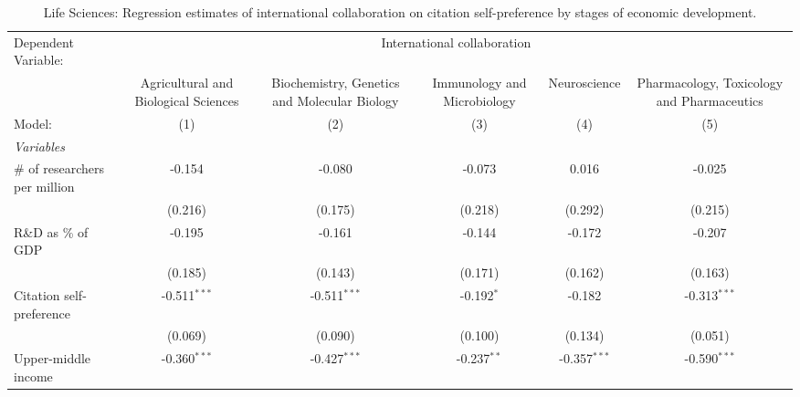 
\begin{table}[H]
   \caption{\label{tab:H1_LifeSciences} Life Sciences: Regression estimates of international collaboration on citation self-preference by
   stages of economic development.}
   \centering
   \scriptsize
   \renewcommand*{\arraystretch}{0.7}
   \begin{tabular}{lccccc}
      \tabularnewline \midrule \midrule
      Dependent Variable: & \multicolumn{5}{c}{International collaboration}\\
                                                     & Agricultural and Biological Sciences & Biochemistry, Genetics and Molecular Biology & Immunology and Microbiology & Neuroscience   & Pharmacology, Toxicology and Pharmaceutics \\   
      Model:                                         & (1)                                  & (2)                                          & (3)                         & (4)            & (5)\\  
      \midrule
      \emph{Variables}\\
      \# of researchers per million                  & -0.154                               & -0.080                                       & -0.073                      & 0.016          & -0.025\\   
                                                     & (0.216)                              & (0.175)                                      & (0.218)                     & (0.292)        & (0.215)\\   
      R\&D as \% of GDP                              & -0.195                               & -0.161                                       & -0.144                      & -0.172         & -0.207\\   
                                                     & (0.185)                              & (0.143)                                      & (0.171)                     & (0.162)        & (0.163)\\   
      Citation self-preference                       & -0.511$^{***}$                       & -0.511$^{***}$                               & -0.192$^{*}$                & -0.182         & -0.313$^{***}$\\   
                                                     & (0.069)                              & (0.090)                                      & (0.100)                     & (0.134)        & (0.051)\\   
      Upper-middle income                            & -0.360$^{***}$                       & -0.427$^{***}$                               & -0.237$^{**}$               & -0.357$^{***}$ & -0.590$^{***}$\\   

\end{tabular}
\end{table}

